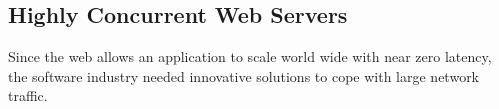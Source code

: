 

\subsection{Highly Concurrent Web Servers} \label{chapter2:web-as-a-platform:web-servers}


Since the web allows an application to scale world wide with near zero latency, the software industry needed innovative solutions to cope with large network traffic.



